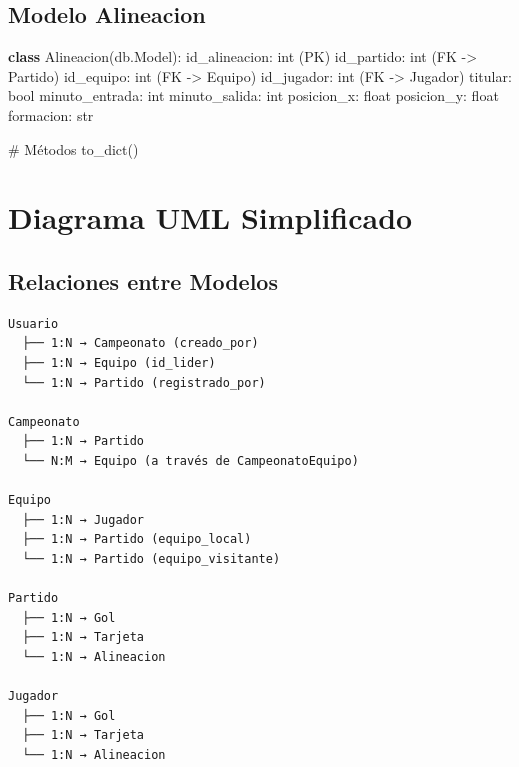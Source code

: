 \documentclass[
  spanish,
  11pt,
  letterpaper,
]{book}
\newenvironment{Shaded}{\begin{snugshade}}{\end{snugshade}}
\newcommand{\BuiltInTok}[1]{\textcolor[rgb]{0.00,0.23,0.31}{#1}}
\newcommand{\CommentTok}[1]{\textcolor[rgb]{0.37,0.37,0.37}{#1}}
\newcommand{\KeywordTok}[1]{\textcolor[rgb]{0.00,0.23,0.31}{\textbf{#1}}}
\newcommand{\NormalTok}[1]{\textcolor[rgb]{0.00,0.23,0.31}{#1}}
\newcommand{\OperatorTok}[1]{\textcolor[rgb]{0.37,0.37,0.37}{#1}}
\begin{document}
\subsection{Modelo Alineacion}\label{modelo-alineacion}

\begin{Shaded}
\begin{Highlighting}[]
\KeywordTok{class}\NormalTok{ Alineacion(db.Model):}
\NormalTok{    id\_alineacion: }\BuiltInTok{int}\NormalTok{ (PK)}
\NormalTok{    id\_partido: }\BuiltInTok{int}\NormalTok{ (FK }\OperatorTok{{-}\textgreater{}}\NormalTok{ Partido)}
\NormalTok{    id\_equipo: }\BuiltInTok{int}\NormalTok{ (FK }\OperatorTok{{-}\textgreater{}}\NormalTok{ Equipo)}
\NormalTok{    id\_jugador: }\BuiltInTok{int}\NormalTok{ (FK }\OperatorTok{{-}\textgreater{}}\NormalTok{ Jugador)}
\NormalTok{    titular: }\BuiltInTok{bool}
\NormalTok{    minuto\_entrada: }\BuiltInTok{int}
\NormalTok{    minuto\_salida: }\BuiltInTok{int}
\NormalTok{    posicion\_x: }\BuiltInTok{float}
\NormalTok{    posicion\_y: }\BuiltInTok{float}
\NormalTok{    formacion: }\BuiltInTok{str}
    
    \CommentTok{\# Métodos}
\NormalTok{    to\_dict()}
\end{Highlighting}
\end{Shaded}

\section{Diagrama UML Simplificado}\label{diagrama-uml-simplificado}

\subsection{Relaciones entre Modelos}\label{relaciones-entre-modelos}

\begin{verbatim}
Usuario
  ├── 1:N → Campeonato (creado_por)
  ├── 1:N → Equipo (id_lider)
  └── 1:N → Partido (registrado_por)

Campeonato
  ├── 1:N → Partido
  └── N:M → Equipo (a través de CampeonatoEquipo)

Equipo
  ├── 1:N → Jugador
  ├── 1:N → Partido (equipo_local)
  └── 1:N → Partido (equipo_visitante)

Partido
  ├── 1:N → Gol
  ├── 1:N → Tarjeta
  └── 1:N → Alineacion

Jugador
  ├── 1:N → Gol
  ├── 1:N → Tarjeta
  └── 1:N → Alineacion
\end{verbatim}
\end{document}

